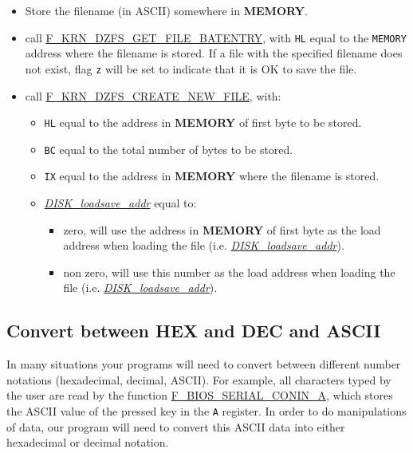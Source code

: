 \documentclass[a4paper,11pt]{article}
\begin{document}
    \begin{itemize}
        \item Store the filename (in ASCII) somewhere in \textbf{MEMORY}.
        \item call \hyperref[func:fkrndzfsgetfilebatentry]{F\_KRN\_DZFS\_GET\_FILE\_BATENTRY},
            with \texttt{HL} equal to the \texttt{MEMORY} address where the
            filename is stored. If a file with the specified filename does not
            exist, flag \texttt{z} will be set to indicate that it is OK to save
            the file.
        \item call \hyperref[func:fkrndzfscreatenewfile]{F\_KRN\_DZFS\_CREATE\_NEW\_FILE},
            with:
            \begin{itemize}
                \item \texttt{HL} equal to the address in \textbf{MEMORY} of
                first byte to be stored.
                \item \texttt{BC} equal to the total number of bytes to
                be stored.
                \item \texttt{IX} equal to the address in \textbf{MEMORY}
                where the filename is stored.
                \item \textit{\hyperref[sec:ram_memmap]{DISK\_loadsave\_addr}}
                equal to:
                \begin{itemize}
                    \item zero, will use the address in \textbf{MEMORY} of first
                    byte as the load address when loading the file (i.e. 
                    \textit{\hyperref[sec:ram_memmap]{DISK\_loadsave\_addr}}).
                    \item non zero, will use this number as the load address
                    when loading the file (i.e. 
                    \textit{\hyperref[sec:ram_memmap]{DISK\_loadsave\_addr}}).
                \end{itemize}
            \end{itemize}
    \end{itemize}

    \subsection{Convert between HEX and DEC and ASCII}
    In many situations your programs will need to convert between different
    number notations (hexadecimal, decimal, ASCII). For example, all characters
    typed by the user are read by the function
    \hyperref[func:fbiosserialconina]{F\_BIOS\_SERIAL\_CONIN\_A}, which stores
    the ASCII value of the pressed key in the \texttt{A} register. In order to
    do manipulations of data, our program will need to convert this ASCII data
    into either hexadecimal or decimal notation.
\end{document}
